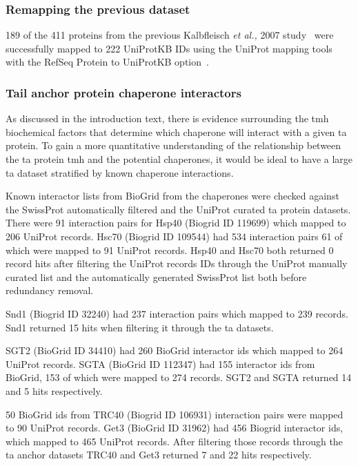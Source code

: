 \subsubsection{Remapping the previous dataset}
189 of the 411 proteins from the previous Kalbfleisch \textit{et al.,} 2007 study~\cite{Kalbfleisch2007} were successfully mapped to 222 UniProtKB IDs using the UniProt mapping tools with the RefSeq Protein to UniProtKB option~\cite{TheUniProtConsortium2014}.

\subsubsection{Tail anchor protein chaperone interactors}
As discussed in the introduction text,  there is evidence surrounding the \gls{tmh} biochemical factors that determine which chaperone will interact with a given \gls{ta} protein.
To gain a more quantitative understanding of the relationship between the \gls{ta} protein \gls{tmh} and the potential chaperones, it would be ideal to have a large \gls{ta} dataset stratified by known chaperone interactions.

Known interactor lists from BioGrid from the chaperones were checked against the SwissProt automatically filtered and the UniProt curated \gls{ta} protein datasets.
There were 91 interaction pairs for Hsp40 (Biogrid ID 119699) which mapped to 206 UniProt records.
Hsc70 (Biogrid ID 109544) had 534 interaction pairs 61 of which were mapped to 91 UniProt records.
Hsp40 and Hsc70 both returned 0 record hits after filtering the UniProt records IDs through the UniProt manually curated list and the automatically generated SwissProt list both before redundancy removal.

Snd1 (Biogrid ID 32240) had 237 interaction pairs which mapped to 239 records.
Snd1 returned 15 hits when filtering it through the \gls{ta} datasets.

SGT2 (BioGrid ID 34410) had 260 BioGrid interactor ids which mapped to 264 UniProt records.
SGTA (BioGrid ID 112347) had 155 interactor ids from BioGrid, 153 of which were mapped to 274 records.
SGT2 and SGTA returned 14 and 5 hits respectively.

50 BioGrid ids from TRC40 (Biogrid ID 106931) interaction pairs were mapped to 90 UniProt records.
Get3 (BioGrid ID 31962) had 456 Biogrid interactor ids, which mapped to 465 UniProt records.
After filtering those records through the \gls{ta} anchor datasets TRC40 and Get3 returned 7 and 22 hits respectively.

